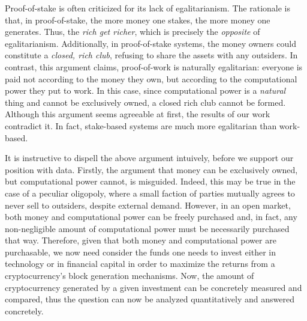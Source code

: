 
Proof-of-stake is often criticized for its lack of egalitarianism. The
rationale is that, in proof-of-stake, the more money one stakes, the more money
one generates. Thus, the \emph{rich get richer}, which is precisely the
\emph{opposite} of egalitarianism. Additionally, in proof-of-stake systems, the
money owners could constitute a \emph{closed, rich club}, refusing to share the
assets with any outsiders.  In contrast, this argument claims, proof-of-work is
naturally egalitarian: everyone is paid not according to the money they own,
but according to the computational power they put to work. In this case, since
computational power is a \emph{natural} thing and cannot be exclusively owned,
a closed rich club cannot be formed.
Although this argument seems agreeable at first, the results of our work contradict it.
In fact, stake-based systems are much more egalitarian than work-based.

It is instructive to dispell the above argument intuively, before we support
our position with data. Firstly, the argument that money can be exclusively
owned, but computational power cannot, is misguided. Indeed, this may be true
in the case of a peculiar oligopoly, where a small faction of parties mutually
agrees to never sell to outsiders, despite external demand. However, in an open
market, both money and computational power can be freely purchased and, in
fact, any non-negligible amount of computational power must be necessarily
purchased that way. Therefore, given that both money and computational power
are purchasable, we now need consider the funds one needs to invest either in
technology or in financial capital in order to maximize the returns from a
cryptocurrency's block generation mechanisms. Now, the amount of cryptocurrency
generated by a given investment can be concretely measured and compared, thus
the question can now be analyzed quantitatively and answered concretely.
